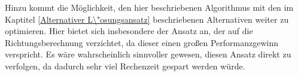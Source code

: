 \documentclass[course=asp]{aspdoc}
\begin{document}

Hinzu kommt die M\"oglichkeit, den hier beschriebenen Algorithmus mit den im Kaptitel \ref{Alternativer L\"osungsansatz} beschriebenen Alternativen weiter zu optimieren. Hier bietet sich insbesondere der Ansatz an, der auf die Richtungsberechnung verzichtet, da dieser einen gro\ss en Performanzgewinn verspricht.
Es w\"are wahrscheinlich sinnvoller gewesen, diesen Ansatz direkt zu verfolgen, da dadurch sehr viel Rechenzeit gespart werden w\"urde.


\newpage

{}
\end{document}
